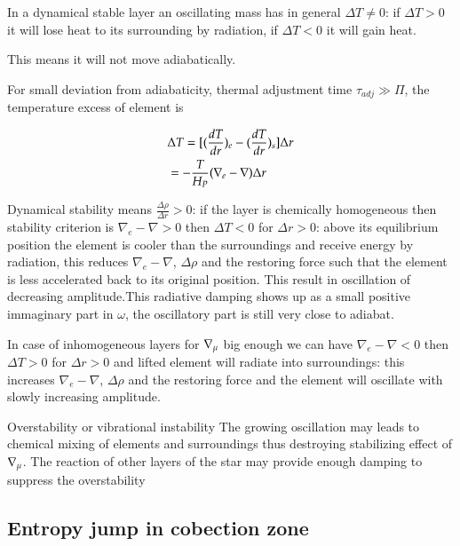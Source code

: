 \documentclass[oneside,12pt,fleqn]{memoir}
\begin{document}
In a dynamical stable layer an oscillating mass has in general $\Delta T\neq0$: if $\Delta T>0$ it will lose heat to its surrounding by radiation, if $\Delta T<0$ it will gain heat.

This means it will not move adiabatically.

For small deviation from adiabaticity, thermal adjustment time $\tau_{adj}\gg\Pi$, the temperature excess of element is

\begin{align*}
&\Delta T=[\Dcvar{\TDy{r}{T}}{e}-\Dcvar{\TDy{r}{T}}{s}]\Delta r\\
&=-\frac{T}{H_P}(\nabla_e-\nabla)\Delta r
\end{align*}

Dynamical stability means $\frac{\Delta\rho}{\Delta r}>0$: if the layer is chemically homogeneous then stability criterion is $\nabla_e-\nabla>0$ then $\Delta T<0$ for $\Delta r>0$: above its equilibrium position the element is cooler than the surroundings and receive energy by radiation, this reduces $\nabla_e-\nabla$, $\Delta\rho$ and the restoring force such that the element is less accelerated back to its original position. This result in oscillation of decreasing amplitude.This radiative damping shows up as a small positive immaginary part in $\omega$, the oscillatory part is still very close to adiabat.

In case of inhomogeneous layers for $\nmu{}$ big enough we can have $\nabla_e-\nabla<0$ then $\Delta T>0$ for $\Delta r>0$ and lifted element will radiate into surroundings: this increases $\nabla_e-\nabla$, $\Delta\rho$ and the restoring force and the element will oscillate with slowly increasing amplitude.

\begin{usefull}{Overstability or vibrational instability}
The growing oscillation may leads to chemical mixing of elements and surroundings thus destroying stabilizing effect of $\nmu{}$.
The reaction of other layers of the star may provide enough damping to suppress the overstability
\end{usefull}


\subsection{Entropy jump in cobection zone}
\end{document}
